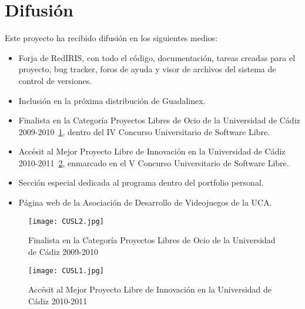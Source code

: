 

\section{Difusión}

Este proyecto ha recibido difusión en los siguientes medios:
\begin{itemize}
    \item Forja de RedIRIS, con todo el código, documentación, tareas creadas para el proyecto, bug tracker, foros de ayuda y
            visor de archivos del sistema de control de versiones.
    \item Inclusión en la próxima distribución de Guadalinex.
    \item Finalista en la Categoría Proyectos Libres de Ocio de la Universidad de Cádiz 2009-2010~\ref{fig:cusl2}, dentro del IV
            Concurso Universitario de Software Libre.
    \item Accésit al Mejor Proyecto Libre de Innovación en la Universidad de Cádiz 2010-2011~\ref{fig:cusl1}, enmarcado en el V
            Concurso Universitario de Software Libre.
    \item Sección especial dedicada al programa dentro del portfolio personal.
    \item Página web de la Asociación de Desarrollo de Videojuegos de la UCA.
\end{itemize}

\begin{figure}[h]
  \begin{center}
    \texttt{[image: CUSL2.jpg]}
  \end{center}
  \caption{Finalista en la Categoría Proyectos Libres de Ocio de la Universidad de Cádiz 2009-2010}
  \label{fig:cusl2}
\end{figure}

\begin{figure}[h]
  \begin{center}
    \texttt{[image: CUSL1.jpg]}
  \end{center}
  \caption{Accésit al Mejor Proyecto Libre de Innovación en la Universidad de Cádiz 2010-2011}
  \label{fig:cusl1}
\end{figure}


